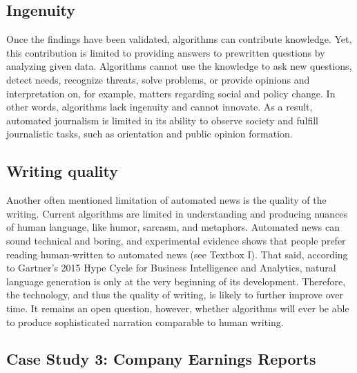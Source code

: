 \documentclass[notoc, symmetric, nobib, nols]{towcenter-book}
\begin{document}
\subsection{Ingenuity}

Once the findings have been validated, algorithms can contribute knowledge. Yet, this contribution is limited to providing answers to prewritten questions by analyzing given data. Algorithms cannot use the knowledge to ask new questions, detect needs, recognize threats, solve problems, or provide opinions and interpretation on, for example, matters regarding social and policy change. In other words, algorithms lack ingenuity and cannot innovate. As a result, automated journalism is limited in its ability to observe society and fulfill journalistic tasks, such as orientation and public opinion formation.\cite{latar15}  

\subsection{Writing quality}

Another often mentioned limitation of automated news is the quality of the writing. Current algorithms are limited in understanding and producing nuances of human language, like humor, sarcasm, and metaphors. Automated news can sound technical and boring, and experimental evidence shows that people prefer reading human-written to automated news (see Textbox I). That said, according to Gartner’s 2015 Hype Cycle for Business Intelligence and Analytics, natural language generation is only at the very beginning of its development.\cite{schlegel15} Therefore, the technology, and thus the quality of writing, is likely to further improve over time. It remains an open question, however, whether algorithms will ever be able to produce sophisticated narration comparable to human writing.\cite{latar15}

\subsection{Case Study 3: Company Earnings Reports}
\end{document}
